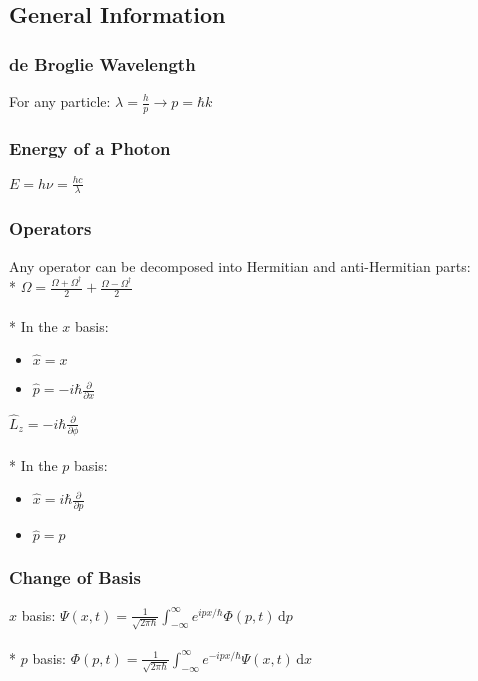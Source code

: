 \subsection{General Information}

\subsubsection{de Broglie Wavelength}
For any particle: \(\displaystyle\lambda=\frac{h}{p}\to p=\hbar k\)

\subsubsection{Energy of a Photon}
\(E=h\nu=\frac{hc}{\lambda}\)

\subsubsection{Operators}
Any operator can be decomposed into Hermitian and anti-Hermitian parts:\\*
\(\displaystyle \Omega=\frac{\Omega+\Omega^{\dag}}{2}+\frac{\Omega-\Omega^{\dag}}{2}\)\\\\*
In the \(x\) basis:
\begin{itemize}
\item \(\hat{x}=x\)
\item \(\hat{p}=-i\hbar\frac{\partial}{\partial x}\)
\end{itemize}
\(\hat{L}_z=-i\hbar\frac{\partial}{\partial\phi}\)\\\\*
In the \(p\) basis:
\begin{itemize}
\item \(\hat{x}=i\hbar\frac{\partial}{\partial p}\)
\item \(\hat{p}=p\)
\end{itemize}

\subsubsection{Change of Basis}
\(x\) basis: \(\displaystyle\Psi(x,t)=\frac{1}{\sqrt{2\pi\hbar}}\int_{-\infty}^{\infty}e^{ipx/\hbar}\Phi(p,t)\,\mathrm{d}p\)\\\\*
\(p\) basis: \(\displaystyle\Phi(p,t)=\frac{1}{\sqrt{2\pi\hbar}}\int_{-\infty}^{\infty}e^{-ipx/\hbar}\Psi(x,t)\,\mathrm{d}x\)

